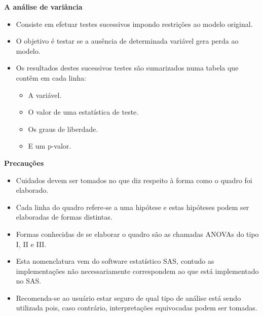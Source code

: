 \documentclass[10pt,
  aspectratio=169,
  serif,
  mathserif,
  professionalfont,
  compress,
  handout,
  ]{beamer}\usepackage[]{graphicx}\usepackage[]{color}
\begin{document}
\begin{frame}[c, allowframebreaks]

\textbf{A análise de variância}

\begin{itemize}
  
  \item Consiste em efetuar testes sucessivos impondo restrições ao modelo original.

	\item O objetivo é testar se a ausência de determinada variável gera perda ao modelo. 

	\item Os resultados destes sucessivos testes são sumarizados numa tabela que contêm em cada linha:
	
	  \begin{itemize}
      
      \item A variável.
      
      \item O valor de uma estatística de teste.
      
      \item Os graus de liberdade.
      
      \item E um p-valor.
      
    \end{itemize}
	
\end{itemize}

\end{frame}


\begin{frame}[c, allowframebreaks]

\textbf{Precauções}

\begin{itemize}
  
  \item Cuidados devem ser tomados no que diz respeito à forma como o quadro foi elaborado. 

	\item Cada linha do quadro refere-se a uma hipótese e estas hipóteses podem ser elaboradas de formas distintas. 

	\item Formas conhecidas de se elaborar o quadro são as chamadas ANOVAs do tipo I, II e III. 

	\item Esta nomenclatura vem do software estatístico SAS, contudo  as implementações não necessariamente correspondem ao que está implementado no SAS. 

	\item Recomenda-se ao usuário estar seguro de qual tipo de análise está sendo utilizada pois, caso contrário, interpretações equivocadas podem ser tomadas.
  
\end{itemize}

\end{frame}
\end{document}
